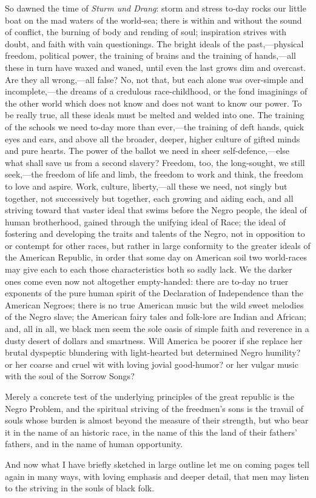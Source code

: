 So dawned the time of \textit{Sturm und Drang}: storm and stress
to-day rocks our little boat on the mad waters of the world-sea; there
is within and without the sound of conflict, the burning of body and
rending of soul; inspiration strives with doubt, and faith with vain
questionings. The bright ideals of the past,---physical freedom,
political power, the training of brains and the training of
hands,---all these in turn have waxed and waned, until even the last
grows dim and overcast. Are they all wrong,---all false? No, not that,
but  each alone was over-simple and incomplete,---the dreams
of a credulous race-childhood, or the fond imaginings of the other
world which does not know and does not want to know our power. To be
really true, all these ideals must be melted and welded into one. The
training of the schools we need to-day more than ever,---the training
of deft hands, quick eyes and ears, and above all the broader, deeper,
higher culture of gifted minds and pure hearts. The power of the
ballot we need in sheer self-defence,---else what shall save us from a
second slavery? Freedom, too, the long-sought, we still seek,---the
freedom of life and limb, the freedom to work and think, the freedom
to love and aspire. Work, culture, liberty,---all these we need, not
singly but together, not successively but together, each growing and
aiding each, and all striving toward that vaster ideal that swims
before the Negro people, the ideal of human brotherhood, gained
through the unifying ideal of Race; the ideal of fostering and
developing the traits and talents of the Negro, not in opposition to
or contempt for other races, but rather in large conformity to the
greater ideals of the American Republic, in order that some day on
American soil two world-races may give each to each those
characteristics both so sadly lack. We the darker ones come even now
not altogether empty-handed: there are to-day no truer exponents of
the pure human spirit of the Declaration of Independence than the
American Negroes; there is no true American music but the wild sweet
melodies of the Negro slave; the American fairy tales and folk-lore
are Indian and African; and, all in all, we black men seem the sole
 oasis of simple faith and reverence in a dusty desert of
dollars and smartness. Will America be poorer if she replace her
brutal dyspeptic blundering with light-hearted but determined Negro
humility? or her coarse and cruel wit with loving jovial good-humor?
or her vulgar music with the soul of the Sorrow Songs?

Merely a concrete test of the underlying principles of the great
republic is the Negro Problem, and the spiritual striving of the
freedmen's sons is the travail of souls whose burden is almost beyond
the measure of their strength, but who bear it in the name of an
historic race, in the name of this the land of their fathers' fathers,
and in the name of human opportunity.

\vspace{1\baselineskip}

And now what I have briefly sketched in large outline let me on coming
pages tell again in many ways, with loving emphasis and deeper detail,
that men may listen to the striving in the souls of black folk.

